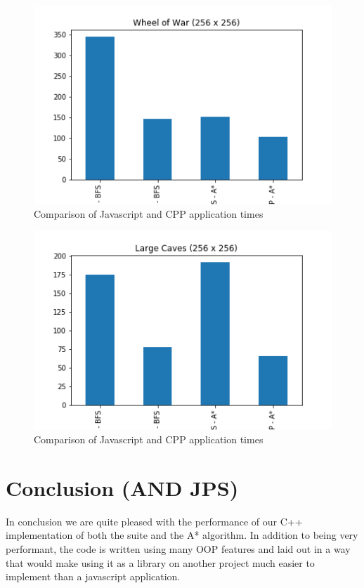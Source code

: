 \documentclass{article}
\begin{document}
\begin{figure}[h!]
\includegraphics[width=\textwidth]{starcraft}
\caption{Comparison of Javascript and CPP application times}
\end{figure}

\begin{figure}[h!]
\includegraphics[width=\textwidth]{bigCaves}
\caption{Comparison of Javascript and CPP application times}
\end{figure}
\newpage

\section{Conclusion (AND JPS)}
In conclusion we are quite pleased with the performance of our C++ implementation of both the suite and the A* algorithm. In addition to being very performant, the code is written using many OOP features and laid out in a way that would make using it as a library on another project much easier to implement than a javascript application.
\end{document}
